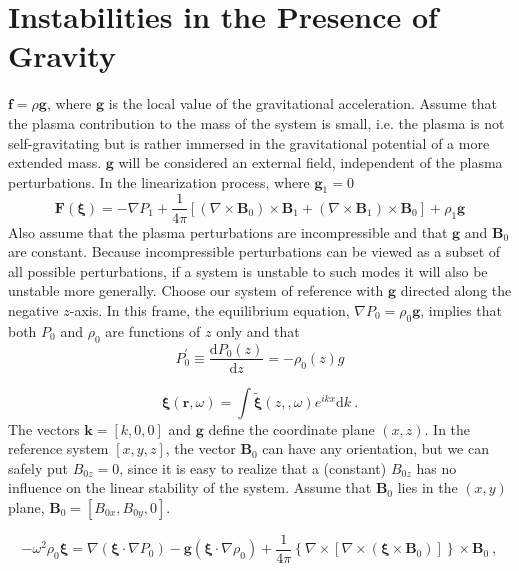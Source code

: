 \documentclass[12pt,a4paper]{article}
\renewcommand{\vec}[1]{\boldsymbol{#1}}
\newcommand{\dif}{\mathrm{d}}
\begin{document}
\section{Instabilities in the Presence of Gravity}
$\vec{f} = \rho \vec{g}$, where $\vec{g}$ is the local value of the gravitational acceleration. Assume that the plasma contribution to the mass of the system is small, i.e. the plasma is not self-gravitating but is rather immersed in the gravitational potential of a more extended mass. $\vec{g}$ will be considered an external field, independent of the plasma perturbations. In the linearization process, where $\vec{g}_1 = 0$
\begin{equation}
\vec{F}(\vec{\xi}) = -\nabla P_1 + \frac{1}{4\pi} \left[(\nabla \times \vec{B}_0)\times \vec{B}_1 +(\nabla \times \vec{B}_1) \times \vec{B}_0 \right] + \rho_1 \vec{g} 
\end{equation}
Also assume that the plasma perturbations are incompressible and that $\vec{g}$ and $\vec{B}_0$ are constant. Because incompressible perturbations can be viewed as a subset of all possible perturbations, if a system is unstable to such modes it will also be unstable more generally. Choose our system of reference with $\vec{g}$ directed along the negative $z$-axis. In this frame, the equilibrium equation, $\nabla P_0 = \rho_0 \vec{g}$, implies that both $P_0$ and $\rho_0$ are functions of $z$ only and that
\begin{equation*}
P^{\prime}_0 \equiv \frac{\dif P_0(z)}{\dif z} = -\rho_0(z) g
\end{equation*}

\begin{equation*}
\vec{\xi}(\vec{r}, \omega) = \int \tilde{\vec{\xi}}(z, , \omega)  e^{i k x} \dif k ~.
\end{equation*}
The vectors $\vec{k} = [k, 0, 0]$ and $\vec{g}$ define the coordinate plane $(x, z)$. In the reference system $[x,y,z]$, the vector $\vec{B}_0$ can have any orientation, but we can safely put $B_{0z} =0$, since it is easy to realize that a (constant) $B_{0z}$ has no influence on the linear stability of the system. Assume that $\vec{B}_0$ lies in the $(x, y)$ plane, $\vec{B}_0 = [B_{0x}, B_{0y}, 0]$. 

\begin{equation}
-\omega^2 \rho_0 \vec{\xi} = \nabla(\vec{\xi} \cdot \nabla P_0) -\vec{g}(\vec{\xi} \cdot \nabla \rho_0) +\frac{1}{4\pi} \left\{\nabla \times [\nabla \times (\vec{\xi} \times \vec{B}_0)] \right\} \times \vec{B}_0 ~,
\end{equation}
\end{document}
